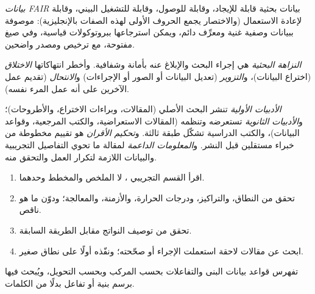 \begin{definition}\label{def:b3:lab-techniques-3:fair}
\emph{بيانات FAIR} بيانات بحثية قابلة
للإيجاد، وقابلة للوصول، وقابلة للتشغيل البيني، وقابلة لإعادة الاستعمال (والاختصار يجمع الحروف الأولى لهذه الصفات بالإنجليزية): موصوفة ببيانات وصفية غنية 
ومعرِّف دائم، ويمكن استرجاعها ببروتوكولات قياسية، وفي صيغ مفتوحة، مع
ترخيص ومصدر واضحين.
\end{definition}

\begin{definition}\label{def:b3:lab-techniques-3:integrity}
\emph{النزاهة البحثية} هي إجراء البحث والإبلاغ عنه
بأمانة وشفافية. وأخطر انتهاكاتها
\emph{الاختلاق} (اختراع البيانات)، و\emph{التزوير}
(تعديل البيانات أو الصور أو الإجراءات) و\emph{الانتحال}
(تقديم عمل الآخرين على أنه عمل المرء نفسه).
\end{definition}

\begin{definition}\label{def:b3:lab-techniques-3:literature}
\emph{الأدبيات الأولية} تنشر البحث
الأصلي (المقالات، وبراءات الاختراع، والأطروحات)؛ و\emph{الأدبيات
الثانوية} تستعرضه وتنظمه (المقالات الاستعراضية،
والكتب المرجعية، وقواعد البيانات)، والكتب الدراسية تشكّل طبقة ثالثة. و\emph{تحكيم
الأقران} هو تقييم مخطوطة من خبراء مستقلين
قبل النشر. و\emph{المعلومات الداعمة}
لمقالة ما تحوي التفاصيل التجريبية والبيانات اللازمة
لتكرار العمل والتحقق منه.
\end{definition}

\begin{method}\label{met:b3:lab-techniques-3:read-paper}
\begin{enumerate}
  \item اقرأ القسم التجريبي ، لا
        الملخص والمخطط وحدهما.
  \item تحقق من النطاق، والتراكيز، ودرجات الحرارة، والأزمنة، والمعالجة؛ ودوّن
        ما هو ناقص.
  \item تحقق من توصيف النواتج مقابل الطريقة السابقة.
  \item ابحث عن مقالات لاحقة استعملت الإجراء أو صحّحته؛ ونفّذه أولًا على
        نطاق صغير.
\end{enumerate}
\end{method}

تفهرس قواعد بيانات البنى والتفاعلات  بحسب المركب 
وبحسب التحويل، ويُبحث فيها برسم بنية أو تفاعل
بدلًا من الكلمات.

